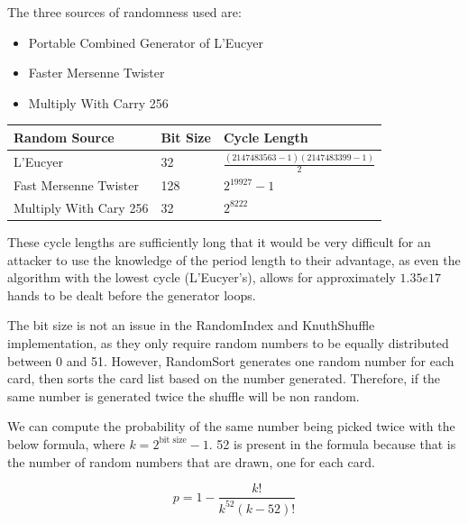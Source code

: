 The three sources of randomness used are:

\begin{itemize}
    \item Portable Combined Generator of L'Eucyer \parencite{leucyer1988}
    \item Faster Mersenne Twister \parencite{matsumoto1998,saito2008}
    \item Multiply With Carry 256 \parencite{marsaglia2003}
\end{itemize}

\begin{center}
    \begin{tabular}{l l l}
    \toprule
    Random Source           & Bit Size  & Cycle Length  \\
    \midrule
    L'Eucyer                & 32        & $ \displaystyle \frac{(2147483563-1)(2147483399-1)}{2}$   \\ \addlinespace
    Fast Mersenne Twister   & 128       & $ \displaystyle {2}^{19927}-1$                            \\ \addlinespace
    Multiply With Cary 256  & 32        & $ \displaystyle {2}^{8222}$                               \\
    \bottomrule
    \end{tabular}
\end{center}

These cycle lengths are sufficiently long that it would be very difficult
for an attacker to use the knowledge of the period length to their advantage,
as even the algorithm with the lowest cycle (L'Eucyer's), allows for
approximately $1.35e17$ hands to be dealt before the generator loops.

The bit size is not an issue in the RandomIndex and KnuthShuffle
implementation, as they only require random numbers to be equally distributed
between 0 and 51. However, RandomSort generates one random number for each
card, then sorts the card list based on the number generated. Therefore, if
the same number is generated twice the shuffle will be non random.

We can compute the probability of the same number being picked twice with the
below formula, where $k = 2^\text{bit size} - 1$. 52 is present in the
formula because that is the number of random numbers that are drawn, one for
each card.

\begin{equation}
p = 1 - \frac{k!}{{k^{52}}(k - 52)!}
\end{equation}

